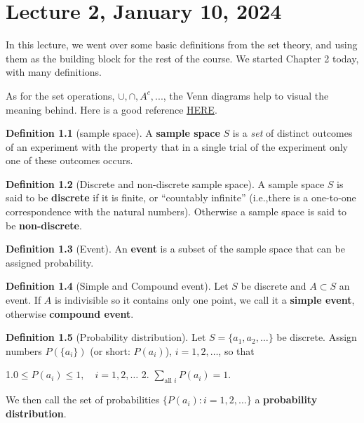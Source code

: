 \documentclass[
]{book}
\theoremstyle{definition}
\newtheorem{definition}{Definition}[chapter]
\theoremstyle{definition}
\theoremstyle{definition}
\theoremstyle{definition}
\theoremstyle{remark}
\begin{document}
\hypertarget{lecture-2-january-10-2024}{%
\chapter{Lecture 2, January 10, 2024}\label{lecture-2-january-10-2024}}

In this lecture, we went over some basic definitions from the set theory, and using them as the building block for the rest of the course. We started Chapter 2 today, with many definitions.

As for the set operations, \(\cup,\cap,A^c,...\), the Venn diagrams help to visual the meaning behind. Here is a good reference \href{https://www.edrawmax.com/article/venn-diagram-symbols-and-set-notations.html}{HERE}.

\begin{definition}[sample space]
A \textbf{sample space} \(S\) is a \emph{set} of distinct outcomes of an experiment with the property that in a single trial of the experiment only one of these outcomes occurs.
\end{definition}

\begin{definition}[Discrete and non-discrete sample space]
A sample space \(S\) is said to be \textbf{discrete} if it is finite, or ``countably infinite'' (i.e.,there is a one-to-one correspondence with the natural numbers). Otherwise a sample space is said to be \textbf{non-discrete}.
\end{definition}

\begin{definition}[Event]
An \textbf{event} is a subset of the sample space that can be assigned probability.
\end{definition}

\begin{definition}[Simple and Compound event]
Let \(S\) be discrete and \(A\subset S\) an event. If \(A\) is indivisible so it contains only one point, we call it a \textbf{simple event}, otherwise \textbf{compound event}.
\end{definition}

\begin{definition}[Probability distribution]
Let \(S=\{a_1,a_2,\dots\}\) be discrete. Assign numbers \(P(\{a_i\})\) (or short: \(P(a_i)\)), \(i=1,2,\dots\), so that

1.\(0\leq P(a_i)\leq 1,\quad i=1,2,\dots\)
2. \(\sum_{\text{all }i}P(a_i)=1\).

We then call the set of probabilities \(\{P(a_i):i=1,2,\dots\}\) a \textbf{probability distribution}.
\end{definition}
\end{document}
